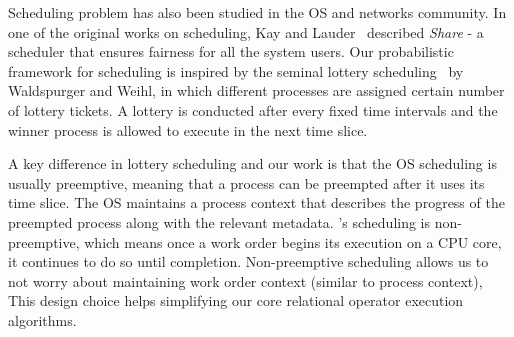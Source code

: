 
Scheduling problem has also been studied in the OS and networks community. 
In one of the original works on scheduling, Kay and Lauder~\cite{kay1988fair} described \textit{Share} -  a scheduler that ensures fairness for all the system users.
Our probabilistic framework for scheduling is inspired by the seminal lottery scheduling~\cite{lottery-scheduling} by Waldspurger and Weihl,
in which different processes are assigned certain number of lottery tickets. 
A lottery is conducted after every fixed time intervals and the winner process is allowed to execute in the next time slice. 

A key difference in lottery scheduling and our work is that the OS scheduling is usually preemptive, meaning that a process can be preempted after it uses its time slice. 
The OS maintains a process context that describes the progress of the preempted process along with the relevant metadata. 
\sys{}'s scheduling is non-preemptive, which means once a work order begins its execution on a CPU core, it continues to do so until completion.
Non-preemptive scheduling allows us to not worry about maintaining work order context (similar to process context), 
This design choice helps simplifying our core relational operator execution algorithms.
 
